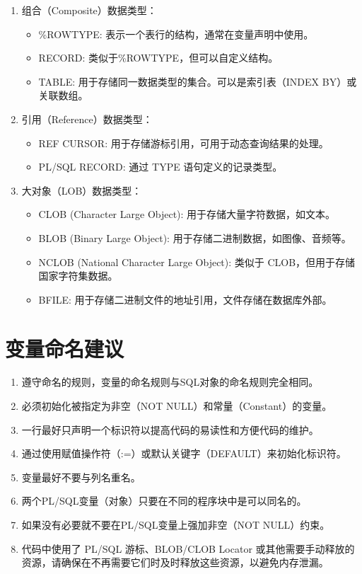 \documentclass[11pt, a4paper, oneside, UTF8]{ctexbook}
\begin{document}
\begin{enumerate}
  \item 组合（Composite）数据类型：
        \begin{itemize}
          \item \%ROWTYPE: 表示一个表行的结构，通常在变量声明中使用。
          \item RECORD: 类似于\%ROWTYPE，但可以自定义结构。
          \item TABLE: 用于存储同一数据类型的集合。可以是索引表（INDEX BY）或关联数组。
        \end{itemize}
  \item 引用（Reference）数据类型：
        \begin{itemize}
          \item REF CURSOR: 用于存储游标引用，可用于动态查询结果的处理。
          \item PL/SQL RECORD: 通过 TYPE 语句定义的记录类型。
        \end{itemize}
  \item 大对象（LOB）数据类型：
        \begin{itemize}
          \item CLOB (Character Large Object): 用于存储大量字符数据，如文本。
          \item BLOB (Binary Large Object): 用于存储二进制数据，如图像、音频等。
          \item NCLOB (National Character Large Object): 类似于 CLOB，但用于存储国家字符集数据。
          \item BFILE: 用于存储二进制文件的地址引用，文件存储在数据库外部。
        \end{itemize}
\end{enumerate}
\section{变量命名建议}
\begin{enumerate}
  \item 遵守命名的规则，变量的命名规则与SQL对象的命名规则完全相同。
  \item 必须初始化被指定为非空（NOT NULL）和常量（Constant）的变量。
  \item 一行最好只声明一个标识符以提高代码的易读性和方便代码的维护。
  \item 通过使用赋值操作符（:=）或默认关键字（DEFAULT）来初始化标识符。
  \item 变量最好不要与列名重名。
  \item 两个PL/SQL变量（对象）只要在不同的程序块中是可以同名的。
  \item 如果没有必要就不要在PL/SQL变量上强加非空（NOT NULL）约束。
  \item 代码中使用了 PL/SQL 游标、BLOB/CLOB Locator 或其他需要手动释放的资源，请确保在不再需要它们时及时释放这些资源，以避免内存泄漏。
\end{enumerate}
\end{document}
